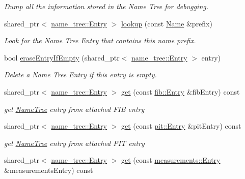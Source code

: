 \begin{DoxyCompactItemize}
\begin{DoxyCompactList}\small\item\em Dump all the information stored in the Name Tree for debugging. \end{DoxyCompactList}\item 
shared\+\_\+ptr$<$ \hyperlink{classnfd_1_1name__tree_1_1Entry}{name\+\_\+tree\+::\+Entry} $>$ \hyperlink{classnfd_1_1NameTree_a166ca6cd5a5f52966b577f78e63aba5f}{lookup} (const \hyperlink{classndn_1_1Name}{Name} \&prefix)
\begin{DoxyCompactList}\small\item\em Look for the Name Tree Entry that contains this name prefix. \end{DoxyCompactList}\item 
bool \hyperlink{classnfd_1_1NameTree_a50c347f2e99cc80129c4c3480cdd262e}{erase\+Entry\+If\+Empty} (shared\+\_\+ptr$<$ \hyperlink{classnfd_1_1name__tree_1_1Entry}{name\+\_\+tree\+::\+Entry} $>$ entry)
\begin{DoxyCompactList}\small\item\em Delete a Name Tree Entry if this entry is empty. \end{DoxyCompactList}\item 
shared\+\_\+ptr$<$ \hyperlink{classnfd_1_1name__tree_1_1Entry}{name\+\_\+tree\+::\+Entry} $>$ \hyperlink{classnfd_1_1NameTree_a710d1559c2f536f56254a39cd7fe8251}{get} (const \hyperlink{classnfd_1_1fib_1_1Entry}{fib\+::\+Entry} \&fib\+Entry) const\hypertarget{classnfd_1_1NameTree_a710d1559c2f536f56254a39cd7fe8251}{}\label{classnfd_1_1NameTree_a710d1559c2f536f56254a39cd7fe8251}

\begin{DoxyCompactList}\small\item\em get \hyperlink{classnfd_1_1NameTree}{Name\+Tree} entry from attached F\+IB entry \end{DoxyCompactList}\item 
shared\+\_\+ptr$<$ \hyperlink{classnfd_1_1name__tree_1_1Entry}{name\+\_\+tree\+::\+Entry} $>$ \hyperlink{classnfd_1_1NameTree_a97c31ea45ea8660d556bf50ef9a9641c}{get} (const \hyperlink{classnfd_1_1pit_1_1Entry}{pit\+::\+Entry} \&pit\+Entry) const\hypertarget{classnfd_1_1NameTree_a97c31ea45ea8660d556bf50ef9a9641c}{}\label{classnfd_1_1NameTree_a97c31ea45ea8660d556bf50ef9a9641c}

\begin{DoxyCompactList}\small\item\em get \hyperlink{classnfd_1_1NameTree}{Name\+Tree} entry from attached P\+IT entry \end{DoxyCompactList}\item 
shared\+\_\+ptr$<$ \hyperlink{classnfd_1_1name__tree_1_1Entry}{name\+\_\+tree\+::\+Entry} $>$ \hyperlink{classnfd_1_1NameTree_a56bb59b46a62a82960676eb44d38367a}{get} (const \hyperlink{classnfd_1_1measurements_1_1Entry}{measurements\+::\+Entry} \&measurements\+Entry) const\hypertarget{classnfd_1_1NameTree_a56bb59b46a62a82960676eb44d38367a}{}\label{classnfd_1_1NameTree_a56bb59b46a62a82960676eb44d38367a}


\end{DoxyCompactItemize}
